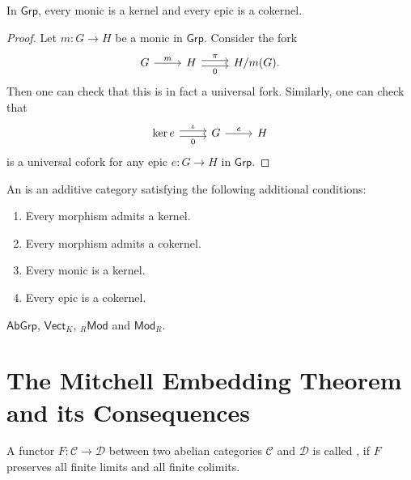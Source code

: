 \begin{lemma}
	In $\mathsf{Grp}$, every monic is a kernel and every epic is a cokernel.
\end{lemma}

\begin{proof}
	Let $m : G \to H$ be a monic in $\mathsf{Grp}$. Consider the fork
	\begin{equation*}
		\begin{tikzcd}
			G \arrow[r,"m"] & H \arrow[r,shift left,"\pi"]\arrow[r,shift right,"0"'] & H/m(G).
		\end{tikzcd}
	\end{equation*}
	\noindent Then one can check that this is in fact a universal fork. Similarly, one can check that
	\begin{equation*}
		\begin{tikzcd}
			\ker e \arrow[r,shift left,"\iota"]\arrow[r,shift right,"0"'] & G \arrow[r,"e"] & H
		\end{tikzcd}
	\end{equation*}
	\noindent is a universal cofork for any epic $e : G \to H$ in $\mathsf{Grp}$.
\end{proof}

\begin{definition}
	An  is an additive category satisfying the following additional conditions:
	\begin{enumerate}[label = \textup{(}\alph*\textup{)}, wide = 0pt]
		\item Every morphism admits a kernel.
		\item Every morphism admits a cokernel.
		\item Every monic is a kernel.
		\item Every epic is a cokernel.
	\end{enumerate}
\end{definition}

\begin{examples}
	$\mathsf{AbGrp}$, $\mathsf{Vect}_K$, $_{R}\mathsf{Mod}$ and $\mathsf{Mod}_R$.	
\end{examples}

\section{The Mitchell Embedding Theorem and its Consequences}

\begin{definition}
	A functor $F : \mathcal{C} \to \mathcal{D}$ between two abelian categories $\mathcal{C}$ and $\mathcal{D}$ is called , if $F$ preserves all finite limits and all finite colimits.
\end{definition}

